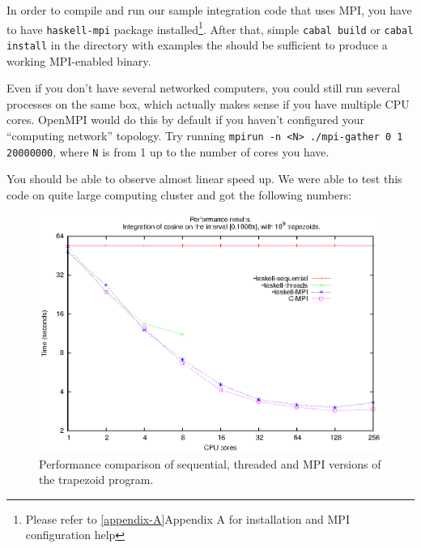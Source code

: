 \documentclass{tmr}
\newcommand{\Todo}[1]{{\textbf{Todo: #1}}}
\begin{document}
In order to compile and run our sample integration code that uses MPI, you have to
have \verb|haskell-mpi| package installed\footnote{Please refer to
  \ref{appendix-A}{Appendix A} for installation and MPI configuration help}. After that,
simple \verb|cabal build| or \verb|cabal install| in the directory
with examples the should be sufficient to produce a working MPI-enabled binary.

Even if you don't have several networked computers, you could still
run several processes on the same box, which actually makes sense if
you have multiple CPU cores. OpenMPI would do this by default if you
haven't configured your ``computing network'' topology. Try running
\verb|mpirun -n <N> ./mpi-gather 0 1 20000000|, where \verb|N| is
from 1 up to the number of cores you have.

You should be able to observe almost linear speed up. We were able to
test this code on quite large computing cluster and got the following
numbers:


\begin{figure}
\centering
\includegraphics{performance.eps}
\vspace{3mm}
\caption{Performance comparison of sequential, threaded and MPI versions of the trapezoid program.
\label{PerformanceGraph}}
\end{figure}
\end{document}

